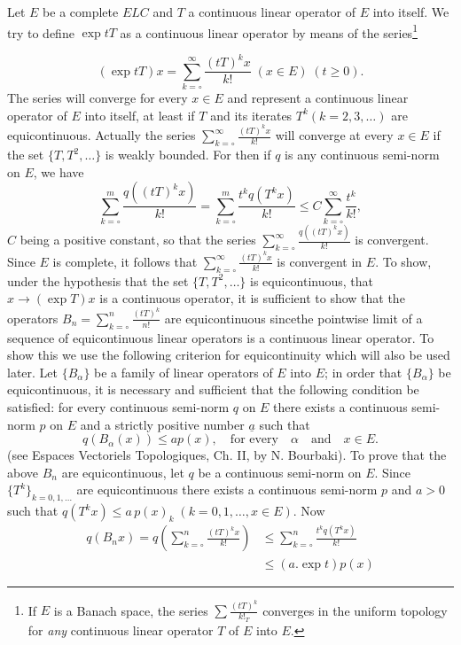 
Let $E$ be a complete $E L C$ and $T$ a continuous linear operator of
$E$ into itself. We try to define $\exp tT$ as a continuous linear
operator by means of the series\footnote{If $E$ is a Banach space, the
  series $\sum\frac{(tT)^k}{k!_T}$ converges in the uniform topology
  for \emph{any} continuous linear operator $T$ of $E$ into $E$.}
 
$$
(\exp tT)x=\sum\limits_{k=\circ}^\infty\frac{(tT)^kx}{k!}\;(x\in
E)\;(t\geq 0). 
$$
The series will converge for every $x\in E$ and represent a continuous
linear operator of $E$ into itself, at least if $T$ and its iterates
$T^k(k=2, 3,\ldots)$ are equicontinuous. Actually the series
$\sum\limits_{k=\circ}^\infty \frac{(tT)^kx}{k!}$ will converge at
every $x\in E$ if the set $\{T, T^2,\ldots\}$ is weakly bounded. For
then if $q$ is any continuous semi-norm on $E$, we have 
$$
\sum\limits_{k=\circ}^m\frac{q((tT)^kx)}{k!}=\sum\limits_{k=\circ}^m
\frac{t^kq(T^kx)}{k!}\leq C\sum\limits_{k=\circ}^\infty
\frac{t^k}{k!},
$$
$C$ being a positive constant, so that the series
$\sum\limits_{k=\circ}^\infty\frac{q((tT)^kx)}{k!}$ is
convergent. Since $E$ is complete, it follows that
$\sum\limits_{k=\circ}^\infty\frac{(tT)^kx}{k!}$ is convergent in
$E$. To show, under the hypothesis that the set $\{T,T^2,\ldots\}$ is
equicontinuous, that $x\to (\exp T)x$ is a continuous operator, it is
sufficient to show that the operators $B_n=\sum\limits_{k=\circ}^n
\frac{(tT)^k}{n!}$ are equicontinuous since\pageoriginale the
pointwise limit of a sequence of equicontinuous linear operators is a
continuous linear operator. To show this we use the following
criterion for equicontinuity which will also be used later. Let
$\{B_\alpha \}$ be a family of linear operators of $E$ into $E$; in
order that $\{B_\alpha\}$ be equicontinuous, it is necessary and
sufficient that the following condition be satisfied: for every
continuous semi-norm $q$ on $E$ there exists a continuous semi-norm
$p$ on $E$ and a strictly positive number $\underline{a}$ such that 
$$
q(B_\alpha (x))\leq a p(x), \quad \text{for every}\quad \alpha \quad
\text{and} \quad x\in E.
$$
(see Espaces Vectoriels Topologiques, Ch. II, by N. Bourbaki). To
prove that the above $B_n$ are equicontinuous, let $q$ be a continuous
semi-norm on $E$. Since $\{T^k\}_{k=0, 1,\ldots}$ are equicontinuous
there exists a continuous semi-norm $p$ and $a>0$ such that
$q(T^kx)\leq a\, p(x)_k\;(k=0, 1,\ldots ,x\in E)$. Now 
\begin{align*}
q(B_n x)=q(\sum\limits_{k=\circ}^n \frac{(tT)^kx}{k!}) &\leq
\sum\limits_{k=\circ}^n \frac{t^kq(T^kx)}{k!}\\
&\leq (a. \exp t) p(x)
\end{align*}
